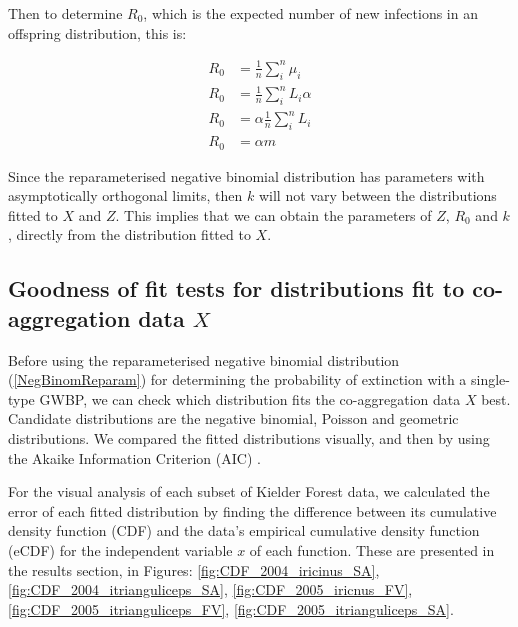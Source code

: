 \documentclass{article}
\begin{document}
Then to determine $ R_0 $, which is the expected number of new infections in an offspring distribution, this is:

\begin{align}
    R_0 &= \frac{1}{n} \sum_i^n \mu_i \nonumber \\
    R_0 &= \frac{1}{n} \sum_i^n L_i \alpha \nonumber \\
    R_0 &= \alpha \frac{1}{n} \sum_i^n L_i \nonumber \\
    R_0 &= \alpha m \label{FindingR0FromCoaggregationMean}
\end{align}

Since the reparameterised negative binomial distribution has parameters with asymptotically orthogonal limits, then $ k $ will not vary between the distributions fitted to $ X $ and $ Z $. This implies that we can obtain the parameters of $ Z $, $ R_0 $ and $ k $, directly from the distribution fitted to $ X $.

\subsection{Goodness of fit tests for distributions fit to co-aggregation data \texorpdfstring{$ X $}{X}} 

Before using the reparameterised negative binomial distribution (\ref{NegBinomReparam}) for determining the probability of extinction with a single-type GWBP, we can check which distribution fits the co-aggregation data $ X $ best. Candidate distributions are the negative binomial, Poisson and geometric distributions. We compared the fitted distributions visually, and then by using the Akaike Information Criterion (AIC) \cite{LloydSmith2005}.

For the visual analysis of each subset of Kielder Forest data, we calculated the error of each fitted distribution by finding the difference between its cumulative density function (CDF) and the data's empirical cumulative density function (eCDF) for the independent variable $ x $ of each function. These are presented in the results section, in Figures: \ref{fig:CDF_2004_iricinus_SA}, \ref{fig:CDF_2004_itrianguliceps_SA}, \ref{fig:CDF_2005_iricnus_FV}, \ref{fig:CDF_2005_itrianguliceps_FV}, \ref{fig:CDF_2005_itrianguliceps_SA}.
\end{document}
